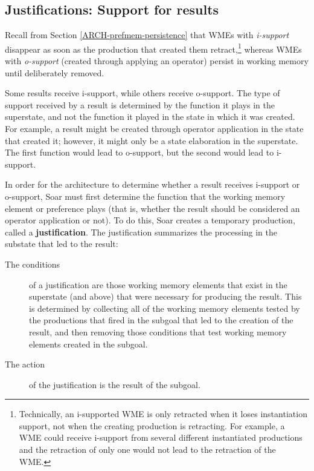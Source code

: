 \subsection{Justifications: Support for results}

Recall from Section \ref{ARCH-prefmem-persistence} that WMEs with \textit{i-support} disappear as soon as the production that created them retract,\footnote{
	Technically, an i-supported WME is only retracted when it loses instantiation support, not when the creating production is retracting. For example, a WME could receive i-support from several different instantiated productions and the retraction of only one would not lead to the retraction of the WME.}
whereas WMEs with \textit{o-support} (created through applying an operator) persist in working memory until deliberately removed.

Some results receive i-support, while others receive o-support.  The type of support received by a result is determined by the function it plays in the superstate, and not the function it played in the state in which it was created. For example, a result might be created through operator application in the state that created it; however, it might only be a state elaboration in the superstate. The first function would lead to o-support, but the second would lead to i-support.

In order for the architecture to determine whether a result receives i-support or o-support, Soar must first determine the function that the working memory element or preference plays (that is, whether the result should be considered an operator application or not). To do this, Soar creates a temporary production, called a \textbf{justification}. The justification summarizes the processing in the substate that led to the result:

\vspace{-10pt}
\begin{description}
	\item[The conditions] of a justification are those working memory elements that exist in the superstate (and above) that were necessary for producing the result.  This is determined by collecting all of the working memory elements tested by the productions that fired in the subgoal that led to the creation of the result, and then removing those conditions that test working memory elements created in the subgoal.
	\vspace{-6pt}
	\item[The action] of the justification is the result of the subgoal.
\end{description}

